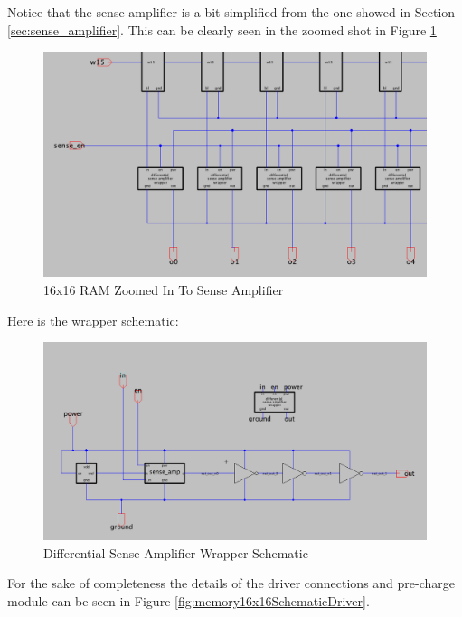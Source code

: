 \documentclass[a4paper]{article}
\begin{document}
Notice that the sense amplifier is a bit simplified from the one showed in Section \ref{sec:sense_amplifier}. This can be clearly seen in the zoomed shot in Figure \ref{fig:memory16x16SchematicSenseAmp}

\begin{figure}[H]
	\centering
	\includegraphics[scale=0.3]{memory16x16SchematicSenseAmp}
	\caption{16x16 RAM Zoomed In To Sense Amplifier}
	\label{fig:memory16x16SchematicSenseAmp}
\end{figure}

Here is the wrapper schematic:

\begin{figure}[H]
	\centering
	\includegraphics[scale=0.3]{senseAmpWrapperSch}
	\caption{Differential Sense Amplifier Wrapper Schematic}
	\label{fig:senseAmpWrapperSch}
\end{figure}

For the sake of completeness the details of the driver connections and pre-charge module can be seen in Figure \ref{fig:memory16x16SchematicDriver}.
\end{document}
